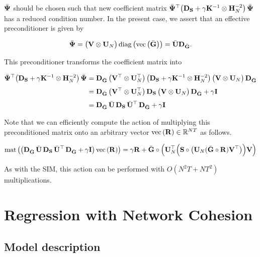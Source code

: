 $\bar{\mathbf{\Psi}} $ should be chosen such that new coefficient matrix $\bar{\mathbf{\Psi}} ^\top \big(\mathbf{D}_{\mathbf{S}} + \gamma \mathbf{K}^{-1} \otimes \mathbf{H}_N^{-2} \big) \, \bar{\mathbf{\Psi}} $ has a reduced condition number. In the present case, we assert that an effective preconditioner is given by 

\begin{equation}
    \bar{\mathbf{\Psi}} = \big(\mathbf{V} \otimes \mathbf{U}_N \big) \, \text{\textup{diag}}\left(\text{\textup{vec}}\left(\bar{\mathbf{G}}\right)\right) = \bar{\mathbf{U}} \mathbf{D}_{\bar{\mathbf{G}}}.
\end{equation}

This preconditioner transforms the coefficient matrix into 

\begin{align*}
    \bar{\mathbf{\Psi}} ^\top \big(\mathbf{D}_{\mathbf{S}} + \gamma \mathbf{K}^{-1} \otimes \mathbf{H}_N^{-2} \big) \, \bar{\mathbf{\Psi}}   &= \mathbf{D}_{\bar{\mathbf{G}}} \, \big(\mathbf{V}^\top \otimes \mathbf{U}_N^\top \big) \, \big(\mathbf{D}_{\mathbf{S}} + \gamma \mathbf{K}^{-1} \otimes \mathbf{H}_N^{-2} \big) \,  \big(\mathbf{V} \otimes \mathbf{U}_N \big) \, \mathbf{D}_{\bar{\mathbf{G}}}   \\[0.1cm]
    &= \mathbf{D}_{\bar{\mathbf{G}}} \, \big(\mathbf{V}^\top \otimes \mathbf{U}_N^\top \big) \, \mathbf{D}_{\mathbf{S}} \, \big(\mathbf{V} \otimes \mathbf{U}_N \big) \, \mathbf{D}_{\bar{\mathbf{G}}} + \gamma \mathbf{I} \\[0.1cm]
    &= \mathbf{D}_{\bar{\mathbf{G}}} \, \bar{\mathbf{U}} \, \mathbf{D}_{\mathbf{S}} \, \bar{\mathbf{U}}^\top \, \mathbf{D}_{\bar{\mathbf{G}}} + \gamma \mathbf{I} 
\end{align*}

Note that we can efficiently compute the action of multiplying this preconditioned matrix onto an arbitrary vector $\text{\textup{vec}}\left(\mathbf{R}\right) \in \mathbb{R}^{NT}$ as follows. 

$$
\text{\textup{mat}}\left(\big(\mathbf{D}_{\bar{\mathbf{G}}} \, \bar{\mathbf{U}} \, \mathbf{D}_{\mathbf{S}} \, \bar{\mathbf{U}}^\top \, \mathbf{D}_{\bar{\mathbf{G}}} + \gamma \mathbf{I}  \big)\, \text{\textup{vec}}\left(\mathbf{R}\right)\right) = \gamma \mathbf{R} + \bar{\mathbf{G}} \circ \left(\mathbf{U}_N^\top \Big( \mathbf{S} \circ \big(\mathbf{U}_N (\bar{\mathbf{G}} \circ \mathbf{R}) \mathbf{V}^\top \big) \Big) \mathbf{V}\right) 
$$

As with the SIM, this action can be performed with $O(N^2T + NT^2)$ multiplications. 



\section{Regression with Network Cohesion}

\label{sec:rnc_mdp}

\subsection{Model description}

